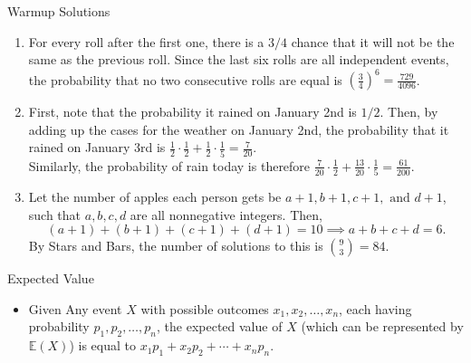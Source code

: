 \documentclass[9pt]{beamer}
\begin{document}
\begin{frame}[t]{Warmup Solutions}
    \begin{enumerate}
        \item For every roll after the first one, there is a $3/4$ chance that it will not be the same as the previous roll. Since the last six rolls are all independent events, the probability that no two consecutive rolls are equal is $\left(\frac{3}{4}\right)^6=\frac{729}{4096}$.
        \item First, note that the probability it rained on January 2nd is $1/2$. Then, by adding up the cases for the weather on January 2nd, the probability that it rained on January 3rd is $\frac{1}{2}\cdot\frac{1}{2}+\frac{1}{2}\cdot\frac{1}{5}=\frac{7}{20}$.\\
        Similarly, the probability of rain today is therefore $\frac{7}{20}\cdot \frac{1}{2}+\frac{13}{20}\cdot\frac{1}{5}=\frac{61}{200}$.
        \item Let the number of apples each person gets be $a+1, b+1, c+1, \text{ and } d+1$, such that $a,b,c,d$ are all nonnegative integers. Then,
        $$(a+1)+(b+1)+(c+1)+(d+1)=10\implies a+b+c+d=6.$$ By Stars and Bars, the number of solutions to this is $\binom{9}{3}=84$.
        
    \end{enumerate}
    
\end{frame}
 
\begin{frame}[fragile, t]{Expected Value}
    \begin{itemize}
        \item Given Any event $X$ with possible outcomes $x_1,x_2,\ldots,x_n$, each having probability $p_1,p_2,\ldots,p_n$, the expected value of $X$ (which can be represented by $\mathbb{E}(X)$) is equal to $x_1p_1+x_2p_2+\cdots+x_np_n$.
        
        
    \end{itemize}
    
    
\end{frame}
\end{document}
